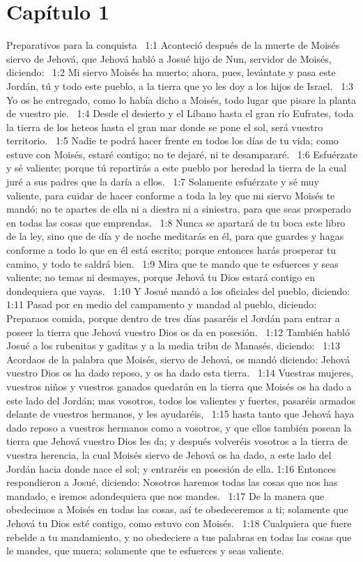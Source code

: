 \section*{Capítulo 1 }
Preparativos para la conquista  
1:1 Aconteció después de la muerte de Moisés siervo de Jehová, que Jehová habló a Josué hijo de Nun, servidor de Moisés, diciendo:  
1:2 Mi siervo Moisés ha muerto; ahora, pues, levántate y pasa este Jordán, tú y todo este pueblo, a la tierra que yo les doy a los hijos de Israel.  
1:3 Yo os he entregado, como lo había dicho a Moisés, todo lugar que pisare la planta de vuestro pie.  
1:4 Desde el desierto y el Líbano hasta el gran río Eufrates, toda la tierra de los heteos hasta el gran mar donde se pone el sol, será vuestro territorio.  
1:5 Nadie te podrá hacer frente en todos los días de tu vida; como estuve con Moisés, estaré contigo; no te dejaré, ni te desampararé.  
1:6 Esfuérzate y sé valiente; porque tú repartirás a este pueblo por heredad la tierra de la cual juré a sus padres que la daría a ellos.  
1:7 Solamente esfuérzate y sé muy valiente, para cuidar de hacer conforme a toda la ley que mi siervo Moisés te mandó; no te apartes de ella ni a diestra ni a siniestra, para que seas prosperado en todas las cosas que emprendas.  
1:8 Nunca se apartará de tu boca este libro de la ley, sino que de día y de noche meditarás en él, para que guardes y hagas conforme a todo lo que en él está escrito; porque entonces harás prosperar tu camino, y todo te saldrá bien.  
1:9 Mira que te mando que te esfuerces y seas valiente; no temas ni desmayes, porque Jehová tu Dios estará contigo en dondequiera que vayas.  
1:10 Y Josué mandó a los oficiales del pueblo, diciendo:  
1:11 Pasad por en medio del campamento y mandad al pueblo, diciendo: Preparaos comida, porque dentro de tres días pasaréis el Jordán para entrar a poseer la tierra que Jehová vuestro Dios os da en posesión.  
1:12 También habló Josué a los rubenitas y gaditas y a la media tribu de Manasés, diciendo:  
1:13 Acordaos de la palabra que Moisés, siervo de Jehová, os mandó diciendo: Jehová vuestro Dios os ha dado reposo, y os ha dado esta tierra.  
1:14 Vuestras mujeres, vuestros niños y vuestros ganados quedarán en la tierra que Moisés os ha dado a este lado del Jordán; mas vosotros, todos los valientes y fuertes, pasaréis armados delante de vuestros hermanos, y les ayudaréis,  
1:15 hasta tanto que Jehová haya dado reposo a vuestros hermanos como a vosotros, y que ellos también posean la tierra que Jehová vuestro Dios les da; y después volveréis vosotros a la tierra de vuestra herencia, la cual Moisés siervo de Jehová os ha dado, a este lado del Jordán hacia donde nace el sol; y entraréis en posesión de ella. 
1:16 Entonces respondieron a Josué, diciendo: Nosotros haremos todas las cosas que nos has mandado, e iremos adondequiera que nos mandes.  
1:17 De la manera que obedecimos a Moisés en todas las cosas, así te obedeceremos a ti; solamente que Jehová tu Dios esté contigo, como estuvo con Moisés.  
1:18 Cualquiera que fuere rebelde a tu mandamiento, y no obedeciere a tus palabras en todas las cosas que le mandes, que muera; solamente que te esfuerces y seas valiente.  
